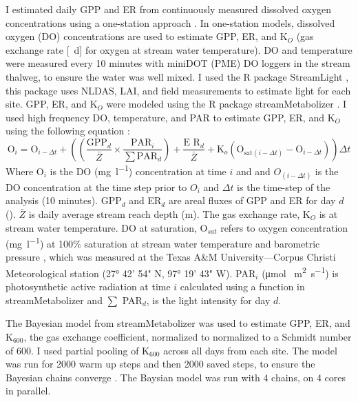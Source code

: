 I estimated daily GPP and ER from continuously measured dissolved oxygen concentrations using a one-station approach \cite{odum_primary_1956}. In one-station models, dissolved oxygen (DO) concentrations are used to estimate GPP, ER, and K$_O$ (gas exchange rate [\unit{\per\day}] for oxygen at stream water temperature). DO and temperature were measured every 10 minutes with miniDOT (PME) DO loggers in the stream thalweg, to ensure the water was well mixed. I used the R package StreamLight \cite{savoy_streamlight_2021}, this package uses NLDAS, LAI, and field measurements to estimate light for each site.  GPP, ER, and K$_O$ were modeled using the R package streamMetabolizer  \cite{appling_streammetabolizer_2018}. I used high frequency DO, temperature, and PAR to estimate GPP, ER, and K$_O$ using the following equation \cite{hotchkissHighRatesDaytime2014, hall_turbidity_2015, ulseth_climate-induced_2018, hall_gas_2019}:
\begin{equation*}\label{metab}
\text{O}_{i}=\text{O}_{i-\Delta t}+\left(\left(\frac{\text{GPP}_{d}}{\bar{Z}} \times \frac{\text{PAR}_{i}}{\sum \text{PAR}_{d}}\right)+\frac{\text{E R}_{d}}{\bar{Z}}+\text{K}_{o}\left(\text{O}_{{\text{sat}}(i-\Delta t)}-\text{O}_{i-\Delta t}\right)\right) \Delta t
\end{equation*}
Where O$_i$ is the DO (\unit{\mg\per\l}) concentration at time $i$ and and $O_{(i-\Delta t)}$ is the DO concentration at the time step prior to $O_i$ and $\Delta t$ is the time-step of the analysis (10 minutes). GPP$_d$ and ER$_d$ are areal fluxes of GPP and ER for day $d$ (\unit{\goxy}). $\bar{Z}$ is daily average stream reach depth (m). The gas exchange rate, K$_O$ is at stream water temperature. DO at saturation, O$_{sat}$ refers to oxygen concentration (\unit{\mg\per\l}) at 100\% saturation at stream water temperature and barometric pressure \cite{garcia_oxygen_1992}, which was measured at the Texas A\&M University—Corpus Christi Meteorological station (27° 42' 54" N, 97° 19' 43" W). PAR$_i$ (\unit{\umol} \unit{\per\square\m\per\s}) is photosynthetic active radiation at time $i$ calculated using a function in streamMetabolizer \cite{appling_streammetabolizer_2018} and $\sum$ PAR$_d$, is the light intensity for day $d$.


The Bayesian model from streamMetabolizer was used to estimate GPP, ER, and K$_{600}$, the gas exchange coefficient, normalized to normalized to a Schmidt number of 600. I used partial pooling of K$_{600}$ across all days from each site. The model was run for 2000 warm up steps and then 2000 saved steps, to ensure the Bayesian chains converge \cite{appling_metabolic_2018, arroita_twenty_2019}. The Baysian model was run with 4 chains, on 4 cores in parallel. 

